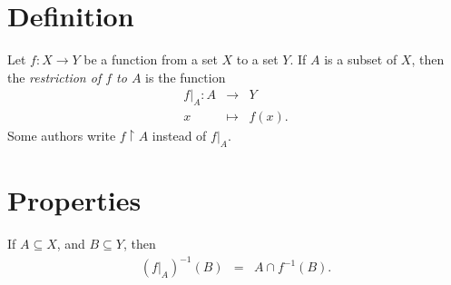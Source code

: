 \documentclass[12pt]{article}
\begin{document}
\section*{Definition}
Let $f\colon X\to Y$ be a function from a set $X$ to a set $Y$. 
If $A$ is a subset of $X$,
then the \emph{restriction of $f$ to $A$} is the function
\begin{eqnarray*}
f|_A\colon A&\to& Y \\
      x&\mapsto& f(x).
\end{eqnarray*}
Some authors write $f\upharpoonright A$ instead of $f|_A$.

\section*{Properties}
If $A\subseteq X$, and $B\subseteq Y$, then
\begin{eqnarray*}
 (f|_A)^{-1}(B)&=&A\cap f^{-1}(B).
\end{eqnarray*}
\end{document}
